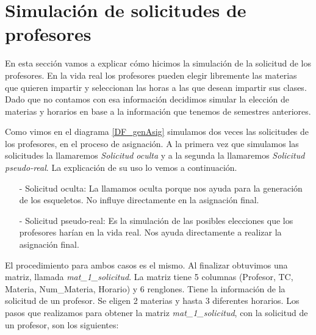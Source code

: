 \section{Simulación de solicitudes de profesores}

En esta sección vamos a explicar cómo hicimos la simulación de la solicitud de los profesores. En la vida real los profesores pueden elegir libremente las materias que quieren impartir y seleccionan las horas a las que desean impartir sus clases. Dado que no contamos con esa información decidimos simular la elección de materias y horarios en base a la información que tenemos de semestres anteriores.

Como vimos en el diagrama \ref{DF_genAsig} simulamos dos veces las solicitudes de los profesores, en el proceso de asignación. A la primera vez que simulamos las solicitudes la llamaremos \textit{Solicitud oculta} y a la segunda la llamaremos \textit{Solicitud pseudo-real}. La explicación de su uso lo vemos a continuación.

\begin{itemize}
\item[-] Solicitud oculta: La llamamos oculta porque nos ayuda para la generación de los esqueletos. No influye directamente en la asignación final.

\item[-] Solicitud pseudo-real: Es la simulación de las posibles elecciones que los profesores harían en la vida real. Nos ayuda directamente a realizar la asignación final.
\end{itemize}

El procedimiento para ambos casos es el mismo. Al finalizar obtuvimos una matriz, llamada \textit{mat\_1\_solicitud}. La matriz tiene 5 columnas (Profesor, TC, Materia, Num\_Materia, Horario) y 6 renglones. Tiene la información de la solicitud de un profesor. Se eligen 2 materias y hasta 3 diferentes horarios.  Los pasos que realizamos para obtener la matriz \textit{mat\_1\_solicitud}, con la solicitud de un profesor, son los siguientes:


